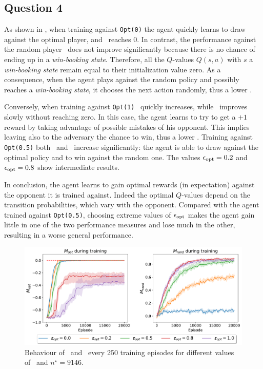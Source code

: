\documentclass[10pt]{IEEEtran}
\begin{document}
\subsection*{Question 4}
As shown in , when training against \texttt{Opt(0)} the agent quickly learns to draw against the optimal player, and \mopt\  reaches 0. In contrast, the performance against the random player \mrand\  does not improve significantly because there is no chance of ending up in a \emph{win-booking state}. Therefore, all the $Q$-values $Q(s, a)$ with $s$ a \emph{win-booking state} remain equal to their initialization value zero. As a consequence, when the agent plays against the random policy and possibly reaches a \emph{win-booking state}, it chooses the next action randomly, thus a lower \mrand. 

Conversely, when training against \texttt{Opt(1)} \mrand\  quickly increases, while \mopt\  improves slowly without reaching zero. In this case, the agent learns to try to get a $+1$ reward by taking advantage of possible mistakes of his opponent. This implies leaving also to the adversary the chance to win, thus a lower \mopt.
Training against \texttt{Opt(0.5)} both \mopt\  and \mrand\  increase significantly: the agent is able to draw against the optimal policy and to win against the random one. The values $\epsilon_{\text{opt}} = 0.2$ and $\epsilon_{\text{opt}} = 0.8$ show intermediate results. 

In conclusion, the agent learns to gain optimal rewards (in expectation) against the opponent it is trained against. Indeed the optimal $Q$-values depend on the transition probabilities, which vary with the opponent. Compared with the agent trained against \texttt{Opt(0.5)}, choosing extreme values of $\epsilon_{\text{opt}}$ makes the agent gain little in one of the two performance measures and lose much in the other, resulting in a worse general performance.

\begin{figure}[h]
    \centering
    \includegraphics[width=\linewidth]{code/figures/performance_epsilon_opt.pdf}
    \caption{Behaviour of \mopt\  and \mrand\  every 250 training episodes for different values of \eopt\ and $n^{\star} = 9146$.}
    \label{plot_question4}
\end{figure}
\end{document}
